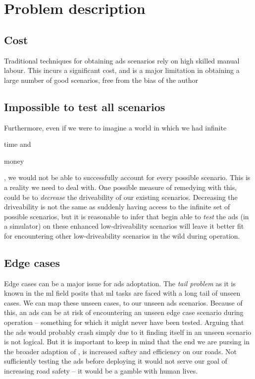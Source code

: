 \chapter{Problem description}

\section{Cost}

Traditional techniques for obtaining \acrshort{ads} scenarios rely on high skilled manual labour.
This incurs a significant cost, and is a major limitation in obtaining a large number of good
scenarios, free from the bias of the author


\section{Impossible to test all scenarios}
Furthermore, even if we were to imagine a world in which we had infinite \begin{inparaenum}
    \item time and
    \item money
\end{inparaenum}, we would not be able to successfully account for every possible scenario. This is
a reality we need to deal with. One possible measure of remedying with this, could be to
\textit{decrease} the driveability of our existing scenarios. Decreasing the driveability is not the
same as suddenly having access to the infinite set of possible scenarios, but it is reasonable to
infer that begin able to \textit{test} the \acrshort{ads} (in a simulator) on these enhanced
low-driveability scenarios will leave it better fit for encountering other low-driveability
scenarios in the wild during operation.

\section{Edge cases}

Edge cases can be a major issue for \acrshort{ads} adoptation. The \textit{tail problem} as it is
known in the \acrshort{ml} field posits that \acrshort{ml} tasks are faced with a long tail of
unseen cases. We can map these unseen cases, to our unseen \acrshort{ads} scenarios. Because of
this, an \acrshort{ads} can be at risk of encountering an unseen edge case scenario during
operation -- something for which it might never have been tested.
Arguing that the \acrshort{ads} would probably crash simply due to it finding itself in an unseen
scenario is not logical. But it is important to keep in mind that the end we are pursing in the
broader adaption of , is increased saftey and efficiency on our roads. Not
sufficiently testing the \acrshort{ads} before deploying it would not serve our goal of increasing
road safety -- it would be a gamble with human lives.